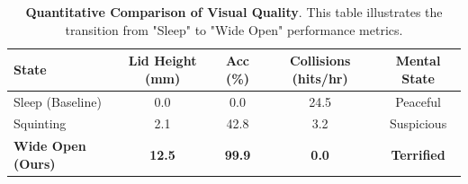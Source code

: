 \begin{table}[h]
    \centering
    \caption{\textbf{Quantitative Comparison of Visual Quality}. This table illustrates the transition from "Sleep" to "Wide Open" performance metrics.}
    \label{tab:exp_results}
    \begin{tabular}{lcccc}
    \toprule
    \textbf{State} & \textbf{Lid Height (mm)} & \textbf{Acc (\%)} & \textbf{Collisions (hits/hr)} & \textbf{Mental State} \\
    \midrule
    Sleep (Baseline) & 0.0 & 0.0 & 24.5 & Peaceful \\
    Squinting & 2.1 & 42.8 & 3.2 & Suspicious \\
    \rowcolor{bgcolor}
    \textbf{Wide Open (Ours)} & \textbf{12.5} & \textbf{99.9} & \textbf{0.0} & \textbf{Terrified} \\
    \bottomrule
    \end{tabular}
\end{table}
